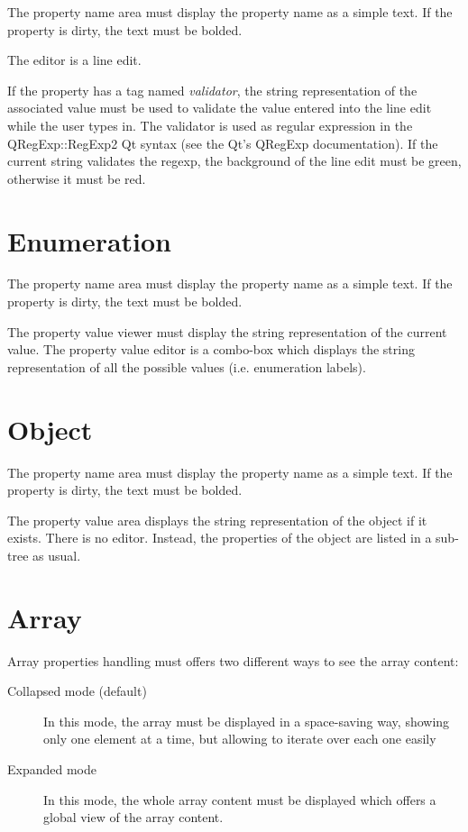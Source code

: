 \documentclass[a4paper, twoside]{report}
\begin{document}
The property name area must display the property name as a simple text. If the property is dirty,
the text must be bolded.

The editor is a line edit.

If the property has a tag named \emph{validator}, the string representation of the associated value
must be used to validate the value entered into the line edit while the user types in. The validator
is used as regular expression in the QRegExp::RegExp2 Qt syntax (see the Qt's QRegExp
documentation). If the current string validates the regexp, the background of the line edit must be
green, otherwise it must be red.

\section{Enumeration}

The property name area must display the property name as a simple text. If the property is dirty,
the text must be bolded.

The property value viewer must display the string representation of the current value.
The property value editor is a combo-box which displays the string representation of all the
possible values (i.e. enumeration labels).

\section{Object}

The property name area must display the property name as a simple text. If the property is dirty,
the text must be bolded.

The property value area displays the string representation of the object if it exists.
There is no editor. Instead, the properties of the object are listed in a sub-tree as usual.

\section{Array}

Array properties handling must offers two different ways to see the array content:
\begin{description}
    \item[Collapsed mode (default)] In this mode, the array must be displayed in a space-saving way,
showing only one element at a time, but allowing to iterate over each one easily
    \item[Expanded mode] In this mode, the whole array content must be displayed which offers a
global view of the array content.
\end{description}
\end{document}
